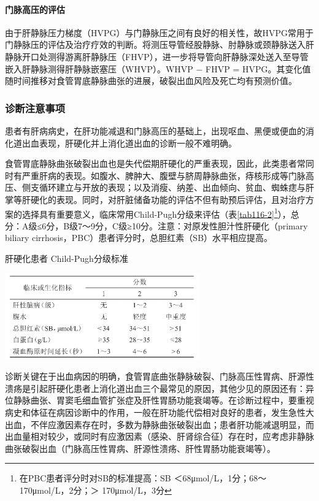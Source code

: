 \paragraph{门脉高压的评估}

由于肝静脉压力梯度（HVPG）与门静脉压之间有良好的相关性，故HVPG常用于门静脉压的评估及治疗疗效的判断。将测压导管经股静脉、肘静脉或颈静脉送入肝静脉开口处测得游离肝静脉压（FHVP），进一步将导管向肝静脉深处送入至导管嵌入肝静脉测得肝静脉嵌塞压（WHVP）。WHVP
− FHVP =
HVPG。其变化值随时间推移对食管胃底静脉曲张的进展，破裂出血风险及死亡均有预测价值。

\subsubsection{诊断注意事项}

患者有肝病病史，在肝功能减退和门脉高压的基础上，出现呕血、黑便或便血的消化道出血表现，肝硬化并上消化道出血的诊断一般不难明确。

食管胃底静脉曲张破裂出血也是失代偿期肝硬化的严重表现，因此，此类患者常同时有严重肝病的表现。如腹水、脾肿大、腹壁与脐周静脉曲张，痔核形成等门脉高压、侧支循环建立与开放的表现；以及消瘦、纳差、出血倾向、贫血、蜘蛛痣与肝掌等肝硬化的表现。同时，对肝脏储备功能的评估不但有助预后评估，且对治疗方案的选择具有重要意义，临床常用Child-Pugh分级来评估（表\ref{tab116-2}\footnote{在PBC患者评分时对SB的标准提高：SB ＜68μmol/L，1分；68～170μmol/L，2分；＞ 170μmol/L，3分}），总分：A级≤6分，B级7～9分，C级≥10分。注意：对原发性胆汁性肝硬化（primary
biliary cirrhosis，PBC）患者评分时，总胆红素（SB）水平相应提高。

\begin{table}[htbp]
\centering
\caption{肝硬化患者 Child-Pugh分级标准}
\label{tab116-2}
\includegraphics[width=3.30208in,height=1.45833in]{./images/Image00490.jpg}
\end{table}



诊断关键在于出血病因的明确，食管胃底曲张静脉破裂、门脉高压性胃病、肝源性溃疡是引起肝硬化患者上消化道出血三个最常见的原因，其他少见的原因还有：异位静脉曲张、胃窦毛细血管扩张症及肝性胃肠功能衰竭等。在诊断过程中，要重视病史和体征在病因诊断中的作用，一般在肝功能代偿相对良好的患者，发生急性大出血，不伴应激因素存在时，多数为静脉曲张破裂出血；患者肝功能减退明显，而出血量相对较少，或同时有应激因素（感染、肝肾综合征）存在时，应考虑非静脉曲张破裂出血（门脉高压性胃病、肝源性溃疡、肝性胃肠功能衰竭等）。

